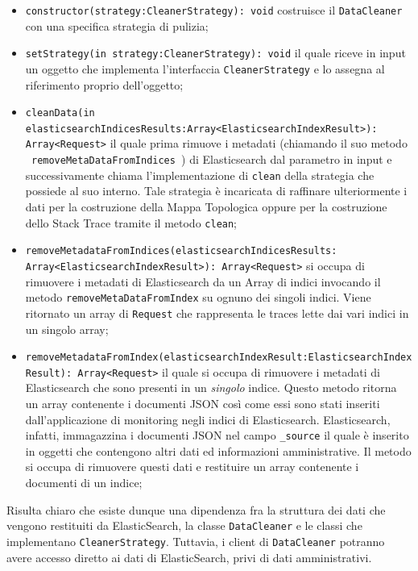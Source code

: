 \begin{itemize} 
	\item  \texttt{constructor(strategy:CleanerStrategy): void} costruisce il \texttt{DataCleaner} con una specifica strategia di pulizia;
	\item \texttt{setStrategy(in strategy:CleanerStrategy): void} il quale riceve in input un oggetto che implementa l'interfaccia \texttt{CleanerStrategy} e lo assegna al riferimento proprio dell'oggetto;

	\item \texttt{cleanData(in elasticsearchIndicesResults:Array<ElasticsearchIndexResult>): Array<Request>} il quale prima rimuove i metadati (chiamando il suo metodo \\ \texttt{ removeMetaDataFromIndices }) di Elasticsearch dal parametro in input e successivamente chiama l'implementazione di \texttt{clean} della strategia che possiede al suo interno.  Tale strategia è incaricata di raffinare ulteriormente i dati per la costruzione della Mappa Topologica oppure per la costruzione dello Stack Trace tramite il metodo \texttt{clean};

	\item \texttt{removeMetadataFromIndices(elasticsearchIndicesResults: \\Array<ElasticsearchIndexResult>): Array<Request>}  si occupa di rimuovere i metadati di Elasticsearch da un Array di indici invocando il metodo \texttt{removeMetaDataFromIndex} su ognuno dei singoli indici. Viene ritornato un array di \texttt{Request} che rappresenta le traces lette dai vari indici in un singolo array;

	\item \texttt{removeMetadataFromIndex(elasticsearchIndexResult:ElasticsearchIndexResult): Array<Request>} il quale si occupa di rimuovere i metadati di Elasticsearch che sono presenti in un \emph{singolo} indice. Questo metodo ritorna un array contenente i documenti JSON così come essi sono stati inseriti dall'applicazione di monitoring negli indici di Elasticsearch. Elasticsearch, infatti, immagazzina i documenti JSON nel campo \texttt{\_source} il quale è inserito in oggetti che contengono altri dati ed informazioni amministrative. Il metodo si occupa di rimuovere questi dati e restituire un array contenente i documenti di un indice;
\end{itemize}

Risulta chiaro che esiste dunque una dipendenza fra la struttura dei dati che vengono restituiti da ElasticSearch, la classe \texttt{DataCleaner} e le classi che implementano \texttt{CleanerStrategy}. Tuttavia, i client di \texttt{DataCleaner} potranno avere accesso diretto ai dati di ElasticSearch, privi di dati amministrativi.
	
